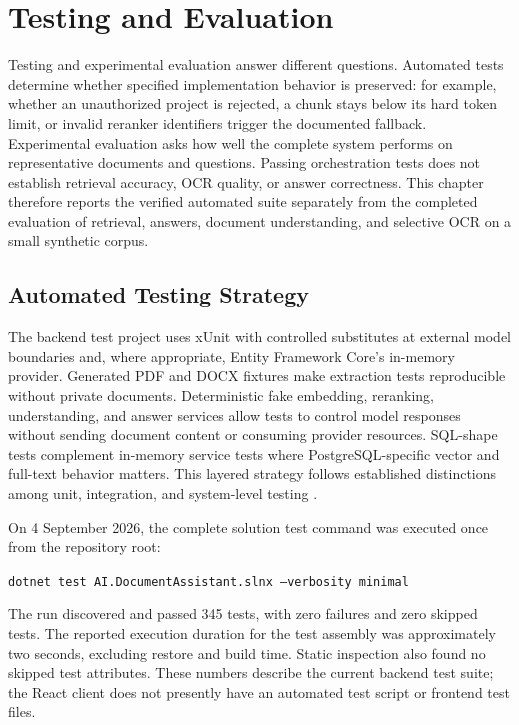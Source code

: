 \chapter{Testing and Evaluation}
\label{chap:testing-evaluation}

Testing and experimental evaluation answer different questions. Automated tests determine whether specified implementation behavior is preserved: for example, whether an unauthorized project is rejected, a chunk stays below its hard token limit, or invalid reranker identifiers trigger the documented fallback. Experimental evaluation asks how well the complete system performs on representative documents and questions. Passing orchestration tests does not establish retrieval accuracy, OCR quality, or answer correctness. This chapter therefore reports the verified automated suite separately from the completed evaluation of retrieval, answers, document understanding, and selective OCR on a small synthetic corpus.

\section{Automated Testing Strategy}
\label{sec:automated-testing}

The backend test project uses xUnit with controlled substitutes at external model boundaries and, where appropriate, Entity Framework Core's in-memory provider. Generated PDF and DOCX fixtures make extraction tests reproducible without private documents. Deterministic fake embedding, reranking, understanding, and answer services allow tests to control model responses without sending document content or consuming provider resources. SQL-shape tests complement in-memory service tests where PostgreSQL-specific vector and full-text behavior matters. This layered strategy follows established distinctions among unit, integration, and system-level testing \cite{Ammann2016SoftwareTesting}.

On 4 September 2026, the complete solution test command was executed once from the repository root:

\begin{center}
\texttt{dotnet test AI.DocumentAssistant.slnx --verbosity minimal}
\end{center}

The run discovered and passed 345 tests, with zero failures and zero skipped tests. The reported execution duration for the test assembly was approximately two seconds, excluding restore and build time. Static inspection also found no skipped test attributes. These numbers describe the current backend test suite; the React client does not presently have an automated test script or frontend test files.

